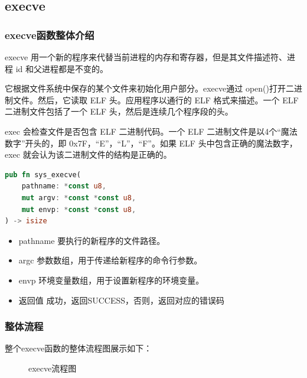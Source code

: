 \subsection{execve}
\subsubsection{execve函数整体介绍}
execve 用一个新的程序来代替当前进程的内存和寄存器，但是其文件描述符、进程 id 和父进程都是不变的。

它根据文件系统中保存的某个文件来初始化用户部分。execve通过 open()打开二进制文件。然后，它读取 ELF 头。应用程序以通行的 ELF 格式来描述。一个 ELF 二进制文件包括了一个 ELF 头，然后是连续几个程序段的头。

exec 会检查文件是否包含 ELF 二进制代码。一个 ELF 二进制文件是以4个“魔法数字”开头的，即 0x7F，“E”，“L”，“F”。如果 ELF 头中包含正确的魔法数字， exec  就会认为该二进制文件的结构是正确的。
\begin{lstlisting}[language={Rust}, 
    caption={execve输入参数与返回值}]
pub fn sys_execve(
    pathname: *const u8,
    mut argv: *const *const u8,
    mut envp: *const *const u8,
) -> isize
\end{lstlisting}
\begin{itemize}
    \item pathname 要执行的新程序的文件路径。
    \item argc 参数数组，用于传递给新程序的命令行参数。
    \item envp 环境变量数组，用于设置新程序的环境变量。
    \item 返回值 成功，返回SUCCESS，否则，返回对应的错误码
\end{itemize}
\subsubsection{整体流程}
整个execve函数的整体流程图展示如下：
\begin{figure}[H]
    \centering
    \caption{execve流程图}
\end{figure}

